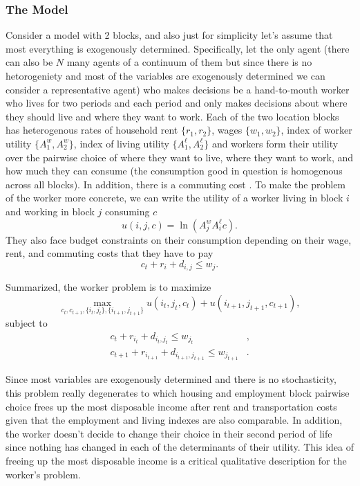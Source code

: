 \documentclass[11pt,english]{article}
\begin{document}
\subsubsection{The Model}

Consider a model with 2 blocks, and also just for simplicity let's assume that most everything is exogenously determined. Specifically, let the only agent (there can also be $N$ many agents of a continuum of them but since there is no hetorogeniety and most of the variables are exogenously determined we can consider a representative agent) who makes decisions be a hand-to-mouth worker who lives for two periods and each period and only makes decisions about where they should live and where they want to work. Each of the two location blocks has heterogenous rates of household rent $\{r_1, r_2\}$, wages $\{w_1, w_2\}$, index of worker utility $\{A^w_1, A^w_2\}$, index of living utility $\{A^\ell_1, A^\ell_2\}$ and workers form their utility over the pairwise choice of where they want to live, where they want to work, and how much they can consume (the consumption good in question is homogenous across all blocks). In addition, there is a commuting cost . To make the problem of the worker more concrete, we can write the utility of a worker living in block $i$ and working in block $j$ consuming $c$ $$u(i,j, c) = \ln \left(A^w_jA^\ell_i c\right).$$ They also face budget constraints on their consumption depending on their wage, rent, and commuting costs that they have to pay $$c_t + r_i  + d_{i,j}\leq w_j.$$

\noindent Summarized, the worker problem is to maximize $$\max_{c_t, c_{t+1}, \{i_t, j_t\}, \{i_{t+1}, j_{t+1}\}} u\left(i_t,j_t, c_t\right) + u\left(i_{t+1},j_{t+1}, c_{t+1}\right),$$
subject to \begin{align*}
c_t + r_{i_t} + d_{i_t,j_t}\leq w_{j_t}&,\\
c_{t+1} + r_{i_{t+1}} + d_{i_{t+1}, j_{t+1}}\leq w_{j_{t+1}}&.
\end{align*}

\noindent Since most variables are exogenously determined and there is no stochasticity, this problem really degenerates to which housing and employment block pairwise choice frees up the most disposable income after rent and transportation costs given that the employment and living indexes are also comparable. In addition, the worker doesn't decide to change their choice in their second period of life since nothing has changed in each of the determinants of their utility. This idea of freeing up the most disposable income is a critical qualitative description for the worker's problem.
\end{document}
